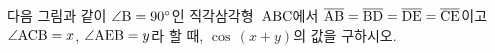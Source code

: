 다음 그림과 같이 $\angle\mathrm{B}=90^\circ$인 직각삼각형~$\mathrm{ABC}$에서 $\overline{\mathrm{AB}}=\overline{\mathrm{BD}}=\overline{\mathrm{DE}}=\overline{\mathrm{CE}}$이고 $\angle\mathrm{ACB}=x$, $\angle\mathrm{AEB}=y$라 할 때, $\cos\,(x+y)$의 값을 구하시오.
\par\smallskip\begin{center}\resizebox{\ifdim\width>\linewidth\linewidth\else\width\fi}{!}{}\end{center}

